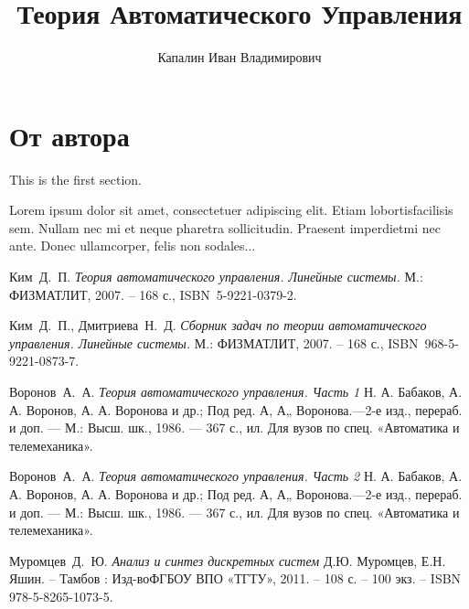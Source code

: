 \documentclass[a4paper,12pt]{extreport}
\title{Теория Автоматического Управления}
\author{Капалин Иван Владимирович}
\date{}
\theoremstyle{plain}
\theoremstyle{definition}
\theoremstyle{remark}
\theoremstyle{plain}
\begin{document}
\maketitle

\tableofcontents

\chapter*{От автора}

    This is the first section.
     
    Lorem  ipsum  dolor  sit  amet,  consectetuer  adipiscing  
    elit.   Etiam  lobortisfacilisis sem.  Nullam nec mi et 
    neque pharetra sollicitudin.  Praesent imperdietmi nec ante. 
    Donec ullamcorper, felis non sodales...






\begin{thebibliography}{0}

     Ким~Д.~П.
    \emph{Теория автоматического управления. Линейные системы.} М.: ФИЗМАТЛИТ, 2007. – 168 с., ISBN~5-9221-0379-2.

     Ким~Д.~П., Дмитриева~Н.~Д.
    \emph{Сборник задач по теории автоматического управления. Линейные системы.} М.: ФИЗМАТЛИТ, 2007. – 168 с., ISBN~968-5-9221-0873-7.

     Воронов~А.~А.
    \emph{Теория автоматического управления. Часть 1} Н. А. Бабаков, А. А. Воронов, А. А. Воронова и др.; Под ред. А, А„ Воронова.—2-е изд., перераб. и доп. — М.: Высш. шк., 1986. — 367 с., ил. Для вузов по спец. «Автоматика и телемеханика».

     Воронов~А.~А.
    \emph{Теория автоматического управления. Часть 2} Н. А. Бабаков, А. А. Воронов, А. А. Воронова и др.; Под ред. А, А„ Воронова.—2-е изд., перераб. и доп. — М.: Высш. шк., 1986. — 367 с., ил. Для вузов по спец. «Автоматика и телемеханика».

     Муромцев~Д.~Ю.
    \emph{Анализ и синтез дискретных систем} Д.Ю. Муромцев, Е.Н. Яшин. – Тамбов : Изд-воФГБОУ ВПО «ТГТУ», 2011. – 108 с. – 100 экз. – ISBN 978-5-8265-1073-5.

\end{thebibliography}
\end{document}
